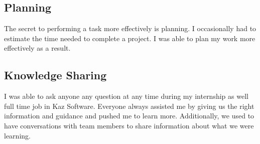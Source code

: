 \subsection{Planning}

The secret to performing a task more effectively is planning.
I occasionally had to estimate the time needed to complete a project.
I was able to plan my work more effectively as a result.

\subsection{Knowledge Sharing}

I was able to ask anyone any question at any time during my internship as well full time job in Kaz Software.
Everyone always assisted me by giving us the right information and guidance and pushed me to learn more.
Additionally, we used to have conversations with team members to share information about what we were learning.

